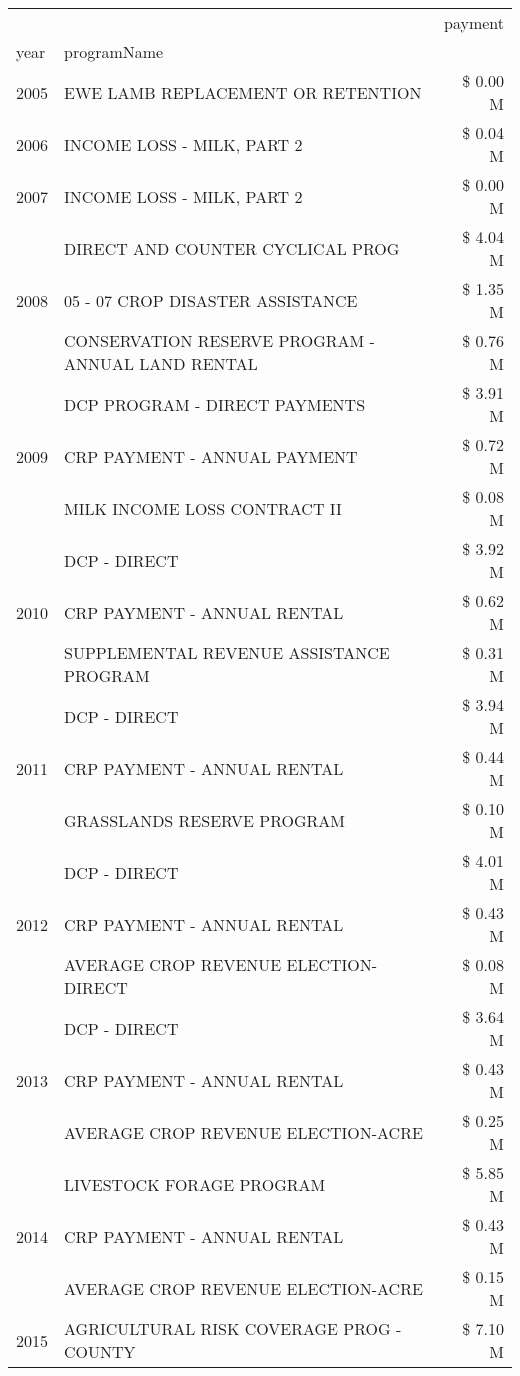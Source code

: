 \begin{tabular}{llr}
\toprule
 &  & payment \\
year & programName &  \\
\midrule
2005 & EWE LAMB REPLACEMENT OR RETENTION & \$ 0.00 M \\
\cline{1-3}
2006 & INCOME LOSS - MILK, PART 2 & \$ 0.04 M \\
\cline{1-3}
2007 & INCOME LOSS - MILK, PART 2 & \$ 0.00 M \\
\cline{1-3}
\multirow[t]{3}{*}{2008} & DIRECT AND COUNTER CYCLICAL PROG & \$ 4.04 M \\
 & 05 - 07 CROP DISASTER ASSISTANCE & \$ 1.35 M \\
 & CONSERVATION RESERVE PROGRAM - ANNUAL LAND RENTAL & \$ 0.76 M \\
\cline{1-3}
\multirow[t]{3}{*}{2009} & DCP PROGRAM - DIRECT PAYMENTS & \$ 3.91 M \\
 & CRP PAYMENT - ANNUAL PAYMENT & \$ 0.72 M \\
 & MILK INCOME LOSS CONTRACT II & \$ 0.08 M \\
\cline{1-3}
\multirow[t]{3}{*}{2010} & DCP - DIRECT & \$ 3.92 M \\
 & CRP PAYMENT - ANNUAL RENTAL & \$ 0.62 M \\
 & SUPPLEMENTAL REVENUE ASSISTANCE PROGRAM & \$ 0.31 M \\
\cline{1-3}
\multirow[t]{3}{*}{2011} & DCP - DIRECT & \$ 3.94 M \\
 & CRP PAYMENT - ANNUAL RENTAL & \$ 0.44 M \\
 & GRASSLANDS RESERVE PROGRAM & \$ 0.10 M \\
\cline{1-3}
\multirow[t]{3}{*}{2012} & DCP - DIRECT & \$ 4.01 M \\
 & CRP PAYMENT - ANNUAL RENTAL & \$ 0.43 M \\
 & AVERAGE CROP REVENUE ELECTION-DIRECT & \$ 0.08 M \\
\cline{1-3}
\multirow[t]{3}{*}{2013} & DCP - DIRECT & \$ 3.64 M \\
 & CRP PAYMENT - ANNUAL RENTAL & \$ 0.43 M \\
 & AVERAGE CROP REVENUE ELECTION-ACRE & \$ 0.25 M \\
\cline{1-3}
\multirow[t]{3}{*}{2014} & LIVESTOCK FORAGE PROGRAM & \$ 5.85 M \\
 & CRP PAYMENT - ANNUAL RENTAL & \$ 0.43 M \\
 & AVERAGE CROP REVENUE ELECTION-ACRE & \$ 0.15 M \\
\cline{1-3}
\multirow[t]{3}{*}{2015} & AGRICULTURAL RISK COVERAGE PROG - COUNTY & \$ 7.10 M \\

\end{tabular}
